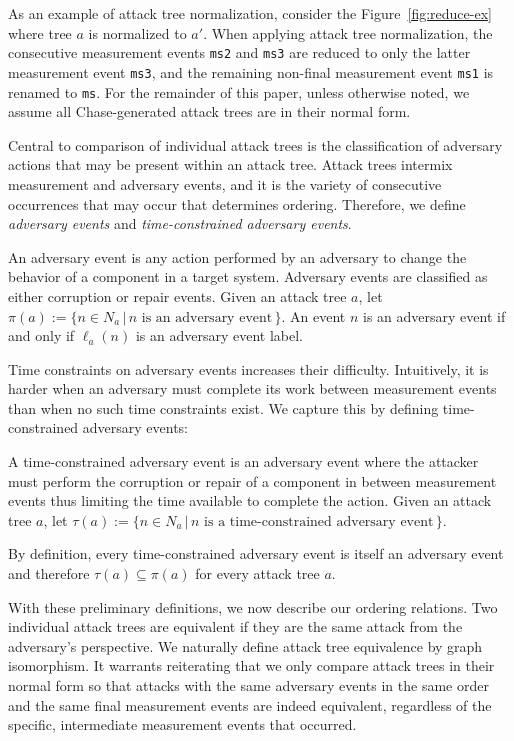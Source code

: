 \documentclass[runningheads]{llncs}
\theoremstyle{definition}
\begin{document}
\noindent As an example of attack tree normalization, consider the
Figure~\ref{fig:reduce-ex} where tree $a$ is normalized to $a'$. When
applying attack tree normalization, the consecutive measurement events
\texttt{ms2} and \texttt{ms3} are reduced to only the latter
measurement event \texttt{ms3}, and the remaining non-final
measurement event \texttt{ms1} is renamed to \texttt{ms}. For the
remainder of this paper, unless otherwise noted, we assume all
Chase-generated attack trees are in their normal form.

Central to comparison of individual attack trees is the classification 
of adversary actions that may be present within an attack tree. Attack 
trees intermix measurement and adversary events, and it is the variety of
consecutive occurrences that may occur that determines ordering. Therefore, 
we define \emph{adversary events} and \emph{time-constrained adversary events}. 

\begin{definition}
  An adversary event is any action performed by an adversary to
  change the behavior of a component in a target system. Adversary
  events are classified as either corruption or repair events. Given
  an attack tree $a$, let $\pi(a) := \{n \in N_a \,|\, n \text{ is
    an adversary event}\,\}$. An event $n$ is an adversary event if
  and only if $\ell_a(n)$ is an adversary event label. 
\end{definition}

Time constraints on adversary events increases their difficulty.
Intuitively, it is harder when an adversary must complete its work
between measurement events than when no such time constraints
exist. We capture this by defining time-constrained adversary events:

\begin{definition}
  A time-constrained adversary event is an adversary event where the
  attacker must perform the corruption or repair of a component in
  between measurement events thus limiting the time available to
  complete the action. Given an attack tree $a$, let $\tau(a) := \{n
  \in N_a \,|\, n \text{ is a time-constrained adversary
    event}\,\}$. 
\end{definition}

\noindent By definition, every time-constrained adversary event is
itself an adversary event and therefore $\tau(a) \subseteq \pi(a)$ for
every attack tree $a$. 

With these preliminary definitions, we now describe our ordering
relations. Two individual attack trees are equivalent if they are
the same attack from the adversary's perspective. We naturally 
define attack tree equivalence by graph isomorphism. It warrants
reiterating that we only compare attack trees in their normal form 
so that attacks with the same adversary events in the same order 
and the same final measurement events are indeed equivalent, regardless 
of the specific, intermediate measurement events that occurred. 
\end{document}
